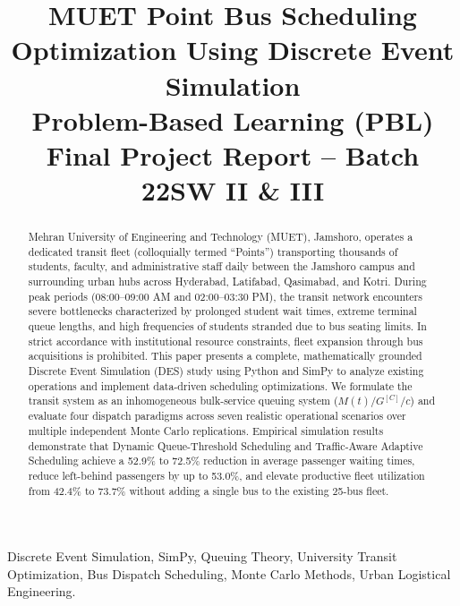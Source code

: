 \documentclass[conference]{IEEEtran}
\begin{document}
\title{MUET Point Bus Scheduling Optimization Using Discrete Event Simulation\\
\large Problem-Based Learning (PBL) Final Project Report -- Batch 22SW II \& III}

\author{
}

\maketitle

\begin{abstract}
Mehran University of Engineering and Technology (MUET), Jamshoro, operates a dedicated transit fleet (colloquially termed ``Points'') transporting thousands of students, faculty, and administrative staff daily between the Jamshoro campus and surrounding urban hubs across Hyderabad, Latifabad, Qasimabad, and Kotri. During peak periods (08:00--09:00 AM and 02:00--03:30 PM), the transit network encounters severe bottlenecks characterized by prolonged student wait times, extreme terminal queue lengths, and high frequencies of students stranded due to bus seating limits. In strict accordance with institutional resource constraints, fleet expansion through bus acquisitions is prohibited. This paper presents a complete, mathematically grounded Discrete Event Simulation (DES) study using Python and SimPy to analyze existing operations and implement data-driven scheduling optimizations. We formulate the transit system as an inhomogeneous bulk-service queuing system ($M(t)/G^{[C]}/c$) and evaluate four dispatch paradigms across seven realistic operational scenarios over multiple independent Monte Carlo replications. Empirical simulation results demonstrate that Dynamic Queue-Threshold Scheduling and Traffic-Aware Adaptive Scheduling achieve a 52.9\% to 72.5\% reduction in average passenger waiting times, reduce left-behind passengers by up to 53.0\%, and elevate productive fleet utilization from 42.4\% to 73.7\% without adding a single bus to the existing 25-bus fleet.
\end{abstract}

\begin{IEEEkeywords}
Discrete Event Simulation, SimPy, Queuing Theory, University Transit Optimization, Bus Dispatch Scheduling, Monte Carlo Methods, Urban Logistical Engineering.
\end{IEEEkeywords}
\end{document}
